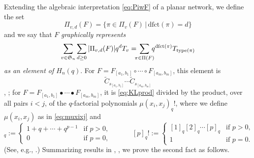 \documentclass[12pt]{amsart}
\newtheorem{lem}[thm]{Lemma}
\theoremstyle{definition}
\numberwithin{equation}{section}
\newcommand{\sn}{\mathfrak{S}_n}
\newcommand{\hnq}{H_n(q)}
\newcommand{\wtc}[2]{\widetilde{C}_{#1}}
\newcommand{\defeq}{:=}
\newcommand{\dfct}{\mathrm{dfct}}
\newcommand{\ctr}[1]{{x}_{#1}}
\newcommand{\type}{\mathrm{type}}
\newcommand{\nTksp}{\negthickspace\negthickspace}
\newcommand{\ocnet}[1]{\mathcal F_{#1}}%
\begin{document}
Extending the algebraic interpretation \eqref{eq:PiwF} of a planar network, we define the set
\begin{equation}\label{eq:Pi with v and d}
    \Pi_{v,d}(F) = \{ \pi \in \Pi_v(F) \,|\, \dfct(\pi) = d \}
\end{equation}
and we
say that $F$ {\em graphically
represents}
\begin{equation}\label{eq:Gtozhnq}
    \sum_{v \in \sn} \sum_{d \geq 0} |\Pi_{v,d}(F)|q^d T_v 
    = \nTksp\sum_{\pi \in \Pi(F)}\nTksp q^{\dfct(\pi)}T_{\type(\pi)}
\end{equation}
{\em as an element of $\hnq$}.
For $F = F_{[a_1,b_1]} \circ \cdots \circ F_{[a_m,b_m]}$, this element is
\begin{equation}\label{eq:KLprod}
    \wtc{s_{[a_1,b_1]}}q \cdots \wtc{s_{[a_m,b_m]}}q
    \end{equation}
  \cite[Cor.\,5.3]{CSkanTNNChar}, \cite[Prop.\,4.2]{SkanNNDCB};  
for $F = F_{[a_1,b_1]} \bullet \cdots \bullet F_{[a_m,b_m]}$, it is
\eqref{eq:KLprod} divided by
the product, over all pairs %
$i < j$, of the
$q$-factorial polynomials 
$\mu(x_i,x_j)_q!$, 
 where we define $\mu(x_i,x_j)$ as in \eqref{eq:muxixj} and
\begin{equation*}
    [p]_q \defeq \begin{cases} 1 + q + \cdots + q^{p-1} &\text{if $p > 0$},\\
    0 &\text{if $p = 0$},
    \end{cases}
    \qquad\quad
    [p]_q! \defeq \begin{cases} [1]_q [2]_q \cdots [p]_q &\text{if $p > 0$},\\
    1 &\text{if $p = 0$}.
    \end{cases}
\end{equation*}
(See, e.g., \cite{StanEC1}.)
Summarizing results in \cite{CSkanTNNChar}, \cite{SkanNNDCB}, we prove the second fact as follows.

\end{document}

